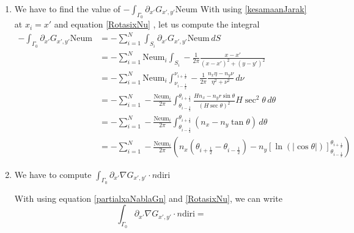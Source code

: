 \documentclass[a4paper,12pt]{article}
\newcommand{\integ}[3]{%
\ensuremath{\displaystyle{\int^{#2}_{#1} #3}}}
\begin{document}
\begin{enumerate}
 \item We have to find the value of $-\integ{\Gamma_0}{}{\partial_{x'} G_{x',y'} \text{Neum}}$
With using \ref{kesamaanJarak} at $x_i=x'$ and equation \ref{RotasixNu} , let us compute the integral
\begin{align}
 -\integ{\Gamma_0}{}{\partial_{x'} G_{x',y'} \text{Neum}}&=-\sum\limits_{i=1}^N  \integ{S_i}{}{\partial_{x'} G_{x',y'} \text{Neum} \, dS}\\
&=-\sum\limits_{i=1}^N \text{Neum}_i \integ{S_i}{}{-\frac{1}{2\pi}\frac{x-x'}{(x-x')^2+(y-y')^2}}\\
&=-\sum\limits_{i=1}^N \text{Neum}_i \integ{\nu_{i-\frac{1}{2}}}{\nu_{i+\frac{1}{2}}}{-\frac{1}{2\pi} \frac{n_x\eta-n_y \nu}{\eta^2+\nu^2} \, d\nu}\\
&=-\sum\limits_{i=1}^N -\frac{\text{Neum}_i}{2\pi} \integ{\theta_{i-\frac{1}{2}}}{\theta_{i+\frac{1}{2}}}{\frac{H n_x-n_y r \sin\theta}{\left( H\sec\theta\right)^2 }H \sec^2\theta \, d\theta}\\
&=-\sum\limits_{i=1}^N -\frac{\text{Neum}_i}{2\pi} \integ{\theta_{i-\frac{1}{2}}}{\theta_{i+\frac{1}{2}}}{(n_x-n_y\tan\theta) \, d\theta}\\
&=-\sum\limits_{i=1}^N -\frac{\text{Neum}_i}{2\pi} \left( n_x(\theta_{i+\frac{1}{2}}- \theta_{i-\frac{1}{2}}) -n_y \left[\ln(\vert \cos\theta\vert )\right]_{\theta_{i-\frac{1}{2}}}^{\theta_{i+\frac{1}{2}}} \right)\label{intPartialxaG}
\end{align}

\item We have to compute $\integ{\Gamma_0}{}{\partial_{x'}\nabla G_{x',y'} \cdot n \text{diri}}$

With using equation \ref{partialxaNablaGn} and \ref{RotasixNu}, we can write
\[
  \integ{\Gamma_0}{}{\partial_{x'}\nabla G_{x',y'} \cdot n \text{diri}}=
\]


\end{enumerate}
\end{document}
